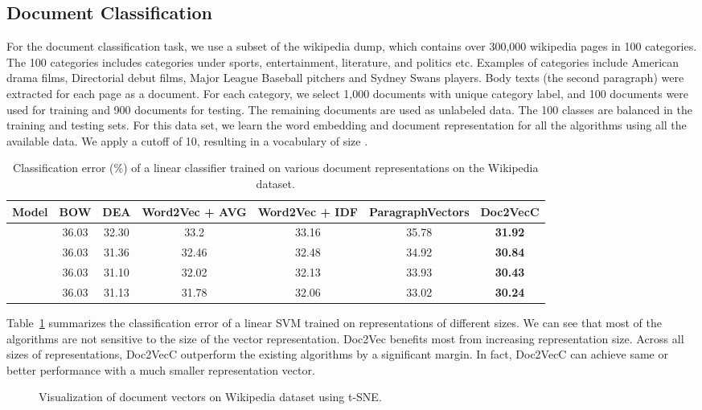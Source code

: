 \documentclass{article} \usepackage{iclr2017_conference,times}
\newcommand{\name}{Doc2VecC}
\begin{document}
\subsection{Document Classification}
For the document classification task, we use a subset of the wikipedia dump, which contains over 300,000 wikipedia pages in 100 categories. The 100 categories includes categories under sports, entertainment, literature, and politics etc. Examples of categories include American drama films,  Directorial debut films, Major League Baseball pitchers and Sydney Swans players.  Body texts (the second paragraph) were extracted for each page as a document. For each category, we select 1,000 documents with unique category label, and 100 documents were used for training and 900 documents for testing. The remaining documents are used as unlabeled data. The 100 classes are balanced in the training and testing sets. For this data set, we learn the word embedding and document representation for all the algorithms using all the available data.  We apply a cutoff of 10, resulting in a vocabulary of size . 

\begin{table}
\caption{Classification error (\%) of a linear classifier trained on various document representations on the Wikipedia dataset. }
\label{tbl:wiki}
\centering
\begin{tabular}{|c||c|c|c|c|c|c|}
\hline
Model &  BOW & DEA & Word2Vec + AVG & Word2Vec + IDF & ParagraphVectors & \name\\
\hline 
\hline
 & 36.03 & 32.30 & 33.2 & 33.16 & 35.78& \textbf{31.92} \\
 & 36.03 & 31.36 & 32.46 & 32.48& 34.92 & \textbf{30.84}\\
 & 36.03 & 31.10 & 32.02 & 32.13& 33.93 & \textbf{30.43}\\
 & 36.03 & 31.13 &  31.78 & 32.06 & 33.02 & \textbf{30.24}\\
\hline
\end{tabular}
\end{table}
Table~\ref{tbl:wiki} summarizes the classification error of a linear SVM trained on representations of different sizes. We can see that most of the algorithms are not sensitive to the size of the vector representation. Doc2Vec benefits most from increasing representation size. Across all sizes of representations, \name{} outperform the existing algorithms by a significant margin. In fact, \name{} can achieve same or better performance with a much smaller representation vector. 
\begin{figure}\centering
    \subfloat[\name{}]{{\texttt{[image: embedding.png]} }}\caption{Visualization of document vectors on Wikipedia dataset using t-SNE.}\label{fig:comp}\end{figure}
\end{document}

